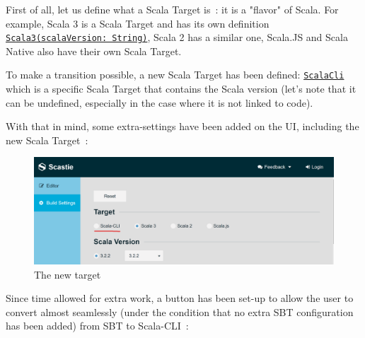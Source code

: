 \documentclass{article}
\begin{document}
First of all, let us define what a Scala Target is~: it is a "flavor" of Scala. For example, Scala 3 is a Scala Target and has its own definition \href{https://github.com/Maeeen/scastie/blob/23e0fa998565a37d8ecfa36fa64d1268a9c1d12c/api/src/main/scala/com.olegych.scastie.api/ScalaTarget.scala#L338}{\lstinline{Scala3(scalaVersion: String)}}, Scala 2 has a similar one, Scala.JS and Scala Native also have their own Scala Target.

To make a transition possible, a new Scala Target has been defined: \href{https://github.com/Maeeen/scastie/blob/23e0fa998565a37d8ecfa36fa64d1268a9c1d12c/api/src/main/scala/com.olegych.scastie.api/ScalaTarget.scala#L338}{\lstinline{ScalaCli}} which is a specific Scala Target that contains the Scala version (let's note that it can be undefined, especially in the case where it is not linked to code).

With that in mind, some extra-settings have been added on the UI, including the new Scala Target~:

\begin{figure}[H]
    \centering
    \includegraphics[width=\linewidth]{./scastie_newtarget.png}
    \caption{The new target}
\end{figure}

Since time allowed for extra work, a button has been set-up to allow the user to convert almost seamlessly (under the condition that no extra SBT configuration has been added) from SBT to Scala-CLI~:
\end{document}
